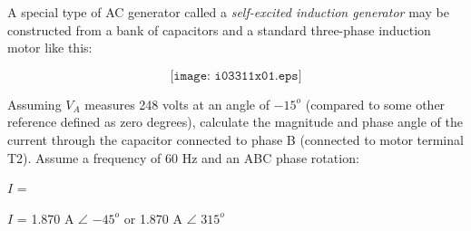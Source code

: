 

A special type of AC generator called a {\it self-excited induction generator} may be constructed from a bank of capacitors and a standard three-phase induction motor like this:

$$\texttt{[image: i03311x01.eps]}$$

Assuming $V_A$ measures 248 volts at an angle of $-15^o$ (compared to some other reference defined as zero degrees), calculate the magnitude and phase angle of the current through the capacitor connected to phase B (connected to motor terminal T2).  Assume a frequency of 60 Hz and an ABC phase rotation:

\vskip 10pt

$I$ = \underbar{\hskip 80pt}







$I$ = 1.870 A $\angle$ $-45^o$ or 1.870 A $\angle$ $315^o$










